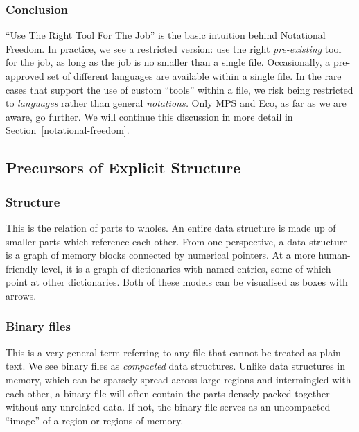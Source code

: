 \documentclass[ twoside,openright,titlepage,numbers=noenddot,headinclude,footinclude,cleardoublepage=empty,abstract=on,
                BCOR=5mm,paper=a4,fontsize=11pt
                ]{scrreprt}
\newcommand{\RTFJ}{Right Tool For The Job}
\newcommand{\URTFJ}{Use The \RTFJ}
\theoremstyle{definition}
\begin{document}
\hypertarget{conclusion-1}{\subsubsection{Conclusion}\label{conclusion-1}}

``\URTFJ'' is the basic intuition behind Notational Freedom. In
practice, we see a restricted version: use the right \emph{pre-existing}
tool for the job, as long as the job is no smaller than a single file.
Occasionally, a pre-approved set of different languages are available
within a single file. In the rare cases that support the use of custom
``tools'' within a file, we risk being restricted to \emph{languages}
rather than general \emph{notations.} Only MPS and Eco, as far as we are
aware, go further. We will continue this discussion in more detail in
Section~\ref{notational-freedom}.

\hypertarget{precursors-of-explicit-structure}{\subsection{Precursors of Explicit
Structure}\label{precursors-of-explicit-structure}}

\hypertarget{structure}{\subsubsection{Structure}\label{structure}}

This is the relation of parts to wholes. An entire data structure is
made up of smaller parts which reference each other. From one
perspective, a data structure is a graph of memory blocks connected by
numerical pointers. At a more human-friendly level, it is a graph of
dictionaries with named entries, some of which point at other
dictionaries. Both of these models can be visualised as boxes with
arrows.

\hypertarget{binary-files}{\subsubsection{Binary files}\label{binary-files}}

This is a very general term referring to any file that cannot be treated
as plain text. We see binary files as \emph{compacted} data structures.
Unlike data structures in memory, which can be sparsely spread across
large regions and intermingled with each other, a binary file will often
contain the parts densely packed together without any unrelated data. If
not, the binary file serves as an uncompacted ``image'' of a region or
regions of memory.
\end{document}
